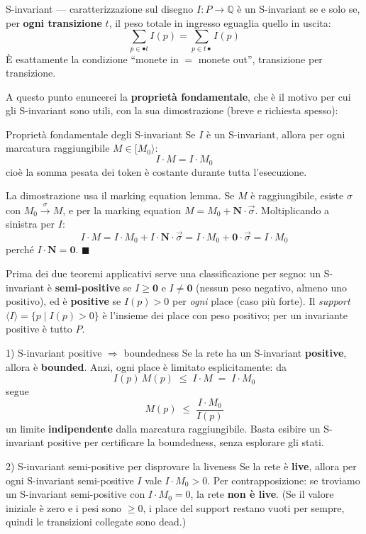 \begin{definizione}{S-invariant — caratterizzazione sul disegno}
$I : P \to \mathbb{Q}$ è un S-invariant se e solo se, per \textbf{ogni transizione} $t$, il peso totale in ingresso eguaglia quello in uscita:
$$\sum_{p \in \bullet t} I(p) = \sum_{p \in t\bullet} I(p)$$
È esattamente la condizione ``monete in $=$ monete out'', transizione per transizione.
\end{definizione}

A questo punto enuncerei la \textbf{proprietà fondamentale}, che è il motivo per cui gli S-invariant sono utili, con la sua dimostrazione (breve e richiesta spesso):

\begin{teorema}{Proprietà fondamentale degli S-invariant}
Se $I$ è un S-invariant, allora per ogni marcatura raggiungibile $M \in [M_0\rangle$:
$$I \cdot M = I \cdot M_0$$
cioè la somma pesata dei token è costante durante tutta l'esecuzione.
\end{teorema}

La dimostrazione usa il marking equation lemma. Se $M$ è raggiungibile, esiste $\sigma$ con $M_0 \xrightarrow{\sigma} M$, e per la marking equation $M = M_0 + \mathbf{N}\cdot\vec{\sigma}$. Moltiplicando a sinistra per $I$:
$$I \cdot M = I \cdot M_0 + I \cdot \mathbf{N} \cdot \vec{\sigma} = I \cdot M_0 + \mathbf{0}\cdot\vec{\sigma} = I \cdot M_0$$
perché $I \cdot \mathbf{N} = \mathbf{0}$. $\blacksquare$

Prima dei due teoremi applicativi serve una classificazione per segno: un S-invariant è \textbf{semi-positive} se $I \ge \mathbf{0}$ e $I \ne \mathbf{0}$ (nessun peso negativo, almeno uno positivo), ed è \textbf{positive} se $I(p) > 0$ per \emph{ogni} place (caso più forte). Il \emph{support} $\langle I\rangle = \{p \mid I(p)>0\}$ è l'insieme dei place con peso positivo; per un invariante positive è tutto $P$.

\begin{teorema}{1) S-invariant positive $\Rightarrow$ boundedness}
Se la rete ha un S-invariant \textbf{positive}, allora è \textbf{bounded}. Anzi, ogni place è limitato esplicitamente: da
$$I(p)\,M(p) \;\le\; I \cdot M \;=\; I \cdot M_0$$
segue
$$M(p) \;\le\; \frac{I \cdot M_0}{I(p)}$$
un limite \textbf{indipendente} dalla marcatura raggiungibile. Basta esibire un S-invariant positive per certificare la boundedness, senza esplorare gli stati.
\end{teorema}

\begin{teorema}{2) S-invariant semi-positive per disprovare la liveness}
Se la rete è \textbf{live}, allora per ogni S-invariant semi-positive $I$ vale $I \cdot M_0 > 0$. Per contrapposizione: se troviamo un S-invariant semi-positive con $I \cdot M_0 = 0$, la rete \textbf{non è live}. (Se il valore iniziale è zero e i pesi sono $\ge 0$, i place del support restano vuoti per sempre, quindi le transizioni collegate sono dead.)
\end{teorema}

